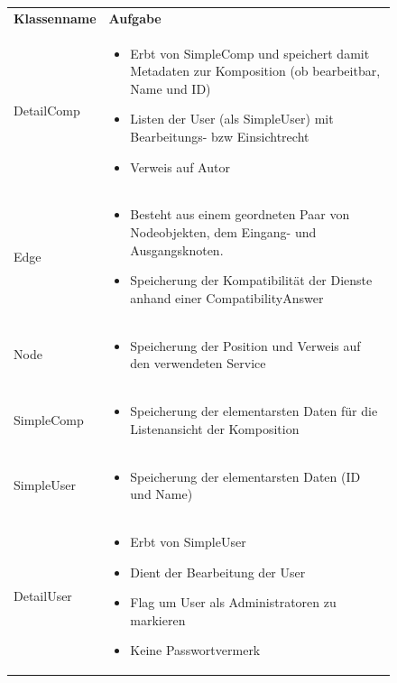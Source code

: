 \begin{figure}[h]
	\begin{tabularx}{\textwidth}{p{} | X}
		\rowcolor[HTML]{C0C0C0}
		\textbf{Klassenname} & \textbf{Aufgabe} \\
		DetailComp & \compress \begin{itemize}
			\item Erbt von SimpleComp und speichert damit Metadaten zur Komposition (ob bearbeitbar, Name und ID)
			\item Listen der User (als SimpleUser) mit Bearbeitungs- bzw Einsichtrecht
			\item Verweis auf Autor
		\end{itemize}\\
		\rowcolor[HTML]{E7E7E7}
		Edge & \compress \begin{itemize}
		  \item Besteht aus einem geordneten Paar von Nodeobjekten, dem Eingang- und Ausgangsknoten.
			\item Speicherung der Kompatibilität der Dienste anhand einer CompatibilityAnswer
		\end{itemize}\\
		Node & \compress \begin{itemize}
			\item Speicherung der Position und Verweis auf den verwendeten Service
		\end{itemize}\\
		\rowcolor[HTML]{E7E7E7}
		SimpleComp & \compress \begin{itemize}
			\item Speicherung der elementarsten Daten für die Listenansicht der Komposition
		\end{itemize}\\
		SimpleUser  & \compress \begin{itemize}
			\item Speicherung der elementarsten Daten (ID und Name)
		\end{itemize}\\
		\rowcolor[HTML]{E7E7E7}
		DetailUser & \compress \begin{itemize}
			\item Erbt von SimpleUser
			\item Dient der Bearbeitung der User
			\item Flag um User als Administratoren zu markieren
			\item Keine Passwortvermerk
		\end{itemize}\\

\end{tabularx}
\end{figure}
